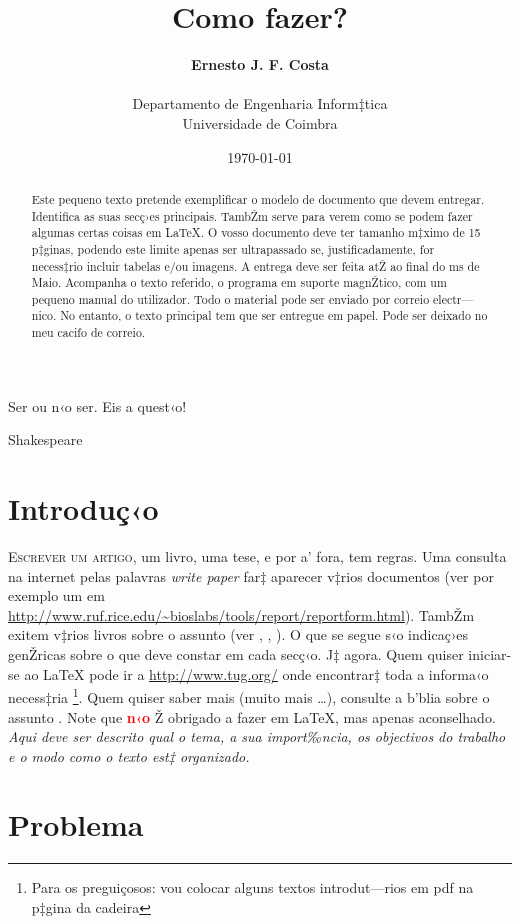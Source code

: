 \documentclass[12pt,portuguese,a4paper]{article}
\title{\Large{\textbf{Como fazer?}}}
\author{\textbf{Ernesto J. F. Costa} \\ \email{ernesto@dei.uc.pt}\\Departamento de Engenharia Inform‡tica \\ Universidade de Coimbra}
\date{\today}
\begin{document}
\maketitle

\begin{abstract}
Este pequeno texto pretende exemplificar o modelo de documento que devem entregar. Identifica as suas sec\c c›es principais. TambŽm serve para verem como se podem fazer algumas certas coisas em \LaTeX{}. O vosso documento deve ter tamanho m‡ximo de 15 p‡ginas, podendo este limite apenas ser ultrapassado se, justificadamente, for necess‡rio incluir tabelas e/ou imagens. A entrega deve ser feita atŽ ao final do ms de Maio. Acompanha o texto referido, o programa em suporte magnŽtico, com um pequeno manual do utilizador. Todo o material pode ser enviado por correio electr—nico. No entanto, o texto principal tem que ser entregue em papel. Pode ser deixado no meu cacifo de correio.
\end{abstract}

\epigraph{Ser ou n‹o ser. Eis a quest‹o!}{Shakespeare}

\section{Introdu\c c‹o}

\lettrine{E}{screver um artigo}, um livro, uma tese, e por a’ fora, tem regras. Uma consulta na internet pelas palavras \textit{write paper} far‡ aparecer v‡rios documentos (ver por exemplo um em \url{http://www.ruf.rice.edu/~bioslabs/tools/report/reportform.html}). TambŽm exitem v‡rios livros sobre o assunto (ver  \cite{davis1997}, \cite{deal2010}, \cite{murray2007}). O que se segue s‹o indica\c c›es genŽricas sobre o que deve constar em cada sec\c c‹o. J‡ agora. Quem quiser iniciar-se ao \LaTeX{} pode ir a \url{http://www.tug.org/} onde encontrar‡ toda a informa‹o necess‡ria \footnote{Para os pregui\c cosos: vou colocar alguns textos introdut—rios em pdf na p‡gina da cadeira}. Quem quiser saber mais (muito mais \ldots), consulte a b’blia sobre o assunto \cite{mg2004}. Note que \textcolor{red}{\textbf{n‹o}} Ž obrigado a fazer em \LaTeX{}, mas apenas aconselhado.\\



\textit{Aqui deve ser descrito qual o tema, a sua import‰ncia, os objectivos do trabalho e o modo como o texto est‡ organizado.}


\section{Problema} 
\end{document}
